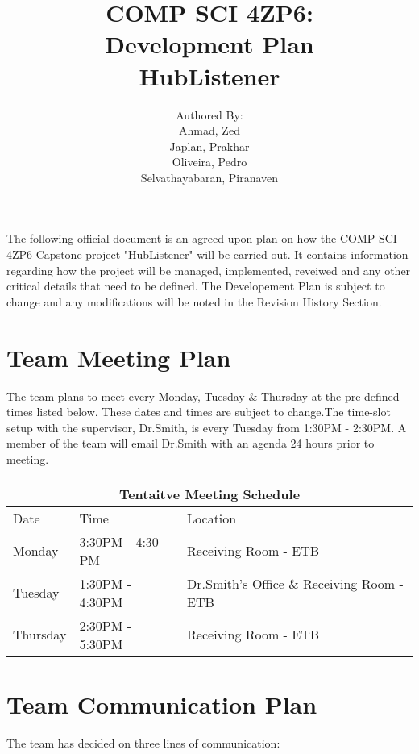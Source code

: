 \documentclass{article}
\title{COMP SCI 4ZP6:\\ Development Plan\\HubListener}
\author{ Authored By:
		\\ Ahmad, Zed
		\\ Japlan, Prakhar 
		\\ Oliveira, Pedro
		\\ Selvathayabaran, Piranaven
}
\date{}
\begin{document}
\newpage

\maketitle

The following official document is an agreed upon plan on how the COMP SCI 4ZP6 Capstone project "HubListener" will be carried out. It contains information regarding how the project will be  managed, implemented, reveiwed and any other critical details that need to be defined. The Developement Plan is subject to change and any modifications will be noted in the Revision History Section. 

\tableofcontents 
\section{Team Meeting Plan}
The team plans to meet every Monday, Tuesday \& Thursday at the pre-defined times listed below. These dates and times are subject to change.The time-slot setup with the supervisor, Dr.Smith, is every Tuesday from 1:30PM - 2:30PM. A member of the team will email Dr.Smith with an agenda 24 hours prior to meeting.\newline 

\begin{tabular}{ |p{3cm}||p{3cm}|p{3cm}|  }
 \hline
 \multicolumn{3}{|c|}{Tentaitve Meeting Schedule} \\
 \hline
 Date &Time  & Location\\
 \hline
 Monday   & 3:30PM - 4:30 PM    & Receiving Room - ETB\\
 Tuesday &   1:30PM - 4:30PM   & Dr.Smith's Office \& Receiving Room - ETB  \\
 Thursday & 2:30PM - 5:30PM & Receiving Room - ETB\\

 \hline
\end{tabular}
\section{Team Communication Plan}

The team has decided on three lines of communication: 
\end{document}
